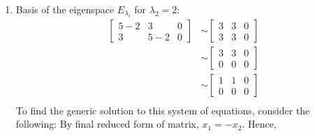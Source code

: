 \documentclass[10pt,letterpaper,final]{report}
\begin{document}
\begin{enumerate}[label=(\alph*)]
\begin{enumerate}[label=(\arabic*)]
                \begin{figure}[H]
                  \centering
                  \caption{{Basis for the eigenspace $E_{\lambda_i}$ corresponding to $\lambda_1 = 8$}}
                \end{figure}
          \item Basis of the eigenspace $E_{\lambda_i}$ for $\lambda_2 = 2$:
                \begin{align*}
                  \left[\begin{array}{rr|r}
                      5 - 2 & 3     & 0 \\
                      3     & 5 - 2 & 0
                    \end{array}\right] & \sim \left[\begin{array}{rr|r}
                                                  3 & 3 & 0 \\
                                                  3 & 3 & 0
                                                \end{array}\right]      \\[1ex]
                                            & \sim \left[\begin{array}{rr|r}
                                                       3 & 3 & 0 \\
                                                       0 & 0 & 0
                                                     \end{array}\right] \\[1ex]
                                            & \sim \left[\begin{array}{rr|r}
                                                       1 & 1 & 0 \\
                                                       0 & 0 & 0
                                                     \end{array}\right] \\[1ex]
                \end{align*}
                To find the generic solution to this system of equations, consider the following:
                By final reduced form of matrix, $x_1 = -x_2$. Hence,
                \begin{align*}

\end{align*}
\end{enumerate}
\end{enumerate}
\end{document}
